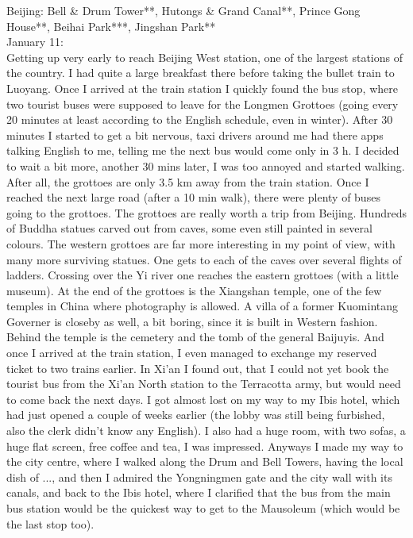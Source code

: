 Beijing: Bell \& Drum Tower**, Hutongs \& Grand Canal**, Prince Gong House**, Beihai Park***, Jingshan Park**\\

January 11:\\
Getting up very early to reach Beijing West station, one of the largest stations of the country. I had quite a large breakfast there before taking the bullet train to Luoyang. Once I arrived at the train station I quickly found the bus stop, where two tourist buses were supposed to leave for the Longmen Grottoes (going every 20 minutes at least according to the English schedule, even in winter). After 30 minutes I started to get a bit nervous, taxi drivers around me had there apps talking English to me, telling me the next bus would come only in 3 h. I decided to wait a bit more, another 30 mins later, I was too annoyed and started walking. After all, the grottoes are only 3.5 km away from the train station. Once I reached the next large road (after a 10 min walk), there were plenty of buses going to the grottoes. The grottoes are really worth a trip from Beijing. Hundreds of Buddha statues carved out from caves, some even still painted in several colours. The western grottoes are far more interesting in my point of view, with many more surviving statues. One gets to each of the caves over several flights of ladders. Crossing over the Yi river one reaches the eastern grottoes (with a little museum). At the end of the grottoes is the Xiangshan temple, one of the few temples in China where photography is allowed. A villa of a former Kuomintang Governer is closeby as well, a bit boring, since it is built in Western fashion. Behind the temple is the cemetery and the tomb of the general Baijuyis. And once I arrived at the train station, I even managed to exchange my reserved ticket to two trains earlier. In Xi'an I found out, that I could not yet book the tourist bus from the Xi'an North station to the Terracotta army, but would need to come back the next days. I got almost lost on my way to my Ibis hotel, which had just opened a couple of weeks earlier (the lobby was still being furbished, also the clerk didn't know any English). I also had a huge room, with two sofas, a huge flat screen, free coffee and tea, I was impressed. Anyways I made my way to the city centre, where I walked along the Drum and Bell Towers, having the local dish of ..., and then I admired the Yongningmen gate and the city wall with its canals, and back to the Ibis hotel, where I clarified that the bus from the main bus station would be the quickest way to get to the Mausoleum (which would be the last stop too).\\

